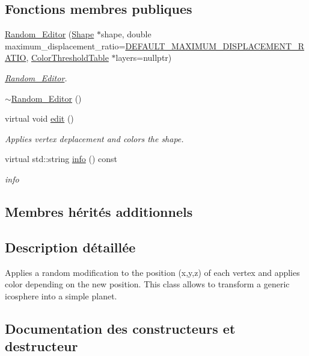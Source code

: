\subsection*{Fonctions membres publiques}
\begin{DoxyCompactItemize}
\item 
\hyperlink{class_random___editor_a68118d2b9929e7c9dbb821ce76554164}{Random\+\_\+\+Editor} (\hyperlink{class_shape}{Shape} $\ast$shape, double maximum\+\_\+displacement\+\_\+ratio=\hyperlink{editor_8h_ad4ef0738a1a62405f443237adf55b8c8}{D\+E\+F\+A\+U\+L\+T\+\_\+\+M\+A\+X\+I\+M\+U\+M\+\_\+\+D\+I\+S\+P\+L\+A\+C\+E\+M\+E\+N\+T\+\_\+\+R\+A\+T\+IO}, \hyperlink{thresholdtable_8h_ab0deb49d07758f9814993774cb9935cc}{Color\+Threshold\+Table} $\ast$layers=nullptr)
\begin{DoxyCompactList}\small\item\em \hyperlink{class_random___editor}{Random\+\_\+\+Editor}. \end{DoxyCompactList}\item 
\hyperlink{class_random___editor_a8a062c4450faafac081ff65b7465545d}{$\sim$\+Random\+\_\+\+Editor} ()
\item 
virtual void \hyperlink{class_random___editor_abea41199b1502f89be0b2914b3c191fc}{edit} ()
\begin{DoxyCompactList}\small\item\em Applies vertex deplacement and colors the shape. \end{DoxyCompactList}\item 
virtual std\+::string \hyperlink{class_random___editor_aa194991b2926aeab96ad5470f549f087}{info} () const
\begin{DoxyCompactList}\small\item\em info \end{DoxyCompactList}\end{DoxyCompactItemize}
\subsection*{Membres hérités additionnels}


\subsection{Description détaillée}
Applies a random modification to the position (x,y,z) of each vertex and applies color depending on the new position. This class allows to transform a generic icosphere into a simple planet. 

\subsection{Documentation des constructeurs et destructeur}
\mbox{\label{class_random___editor_a68118d2b9929e7c9dbb821ce76554164}} 
